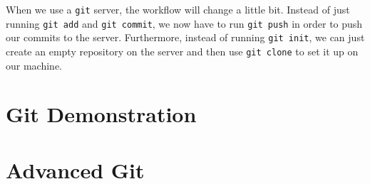 \documentclass[notitlepage]{simple}
\begin{document}
When we use a \verb|git| server, the workflow will change a little bit.
Instead of just running \verb|git add| and \verb|git commit|, we now have to run \verb|git push| in order to push our commits to the server.
Furthermore, instead of running \verb|git init|, we can just create an empty repository on the server and then use \verb|git clone| to set it up on our machine.

\section{Git Demonstration}

\section{Advanced Git}
\end{document}
